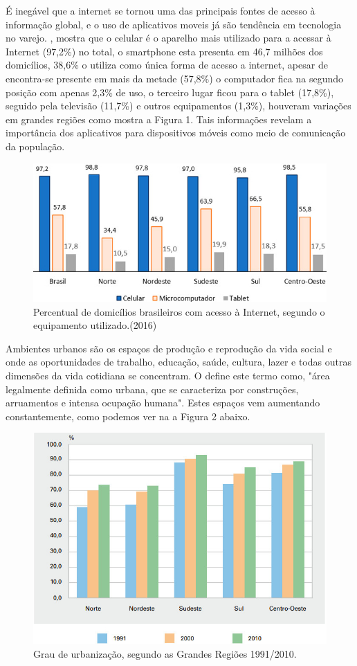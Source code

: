  É inegável que a internet se tornou uma das principais fontes de acesso à informação global, e o uso de aplicativos moveis já são tendência em tecnologia no varejo. , mostra que o celular é o aparelho mais utilizado para a acessar à Internet (97,2\%) no total, o smartphone esta presenta em 46,7 milhões dos domicílios, 38,6\% o utiliza como única forma de acesso a internet, apesar de encontra-se presente em mais da metade (57,8\%) o computador fica na segundo posição com apenas 2,3\% de uso, o terceiro lugar ficou para o tablet (17,8\%), seguido pela televisão (11,7\%) e outros equipamentos (1,3\%), houveram variações em grandes regiões como mostra a Figura 1. Tais informações revelam a importância dos aplicativos para dispositivos móveis como meio de comunicação da população.
 \begin{figure}[H]
 	\centering
 	\caption{Percentual de domicílios brasileiros com acesso à Internet, segundo o equipamento utilizado.(2016)}
 	\includegraphics[width=0.6\linewidth]{Imagens/grafico} 	
 \end{figure}
 
  Ambientes urbanos são os espaços de produção e reprodução da vida social e onde as oportunidades de trabalho, educação, saúde, cultura, lazer e todas outras dimensões da vida cotidiana se concentram. O  define este termo como, "área legalmente definida como urbana, que se caracteriza por construções, arruamentos e intensa ocupação humana". Estes espaços vem  aumentando constantemente, como podemos ver na a Figura 2 abaixo. 
  \begin{figure}[H]
	\centering
 	\caption{Grau de urbanização, segundo as Grandes Regiões 1991/2010.} 
 	\includegraphics[width=0.6\linewidth]{Imagens/grafico2}		
 \end{figure}  

